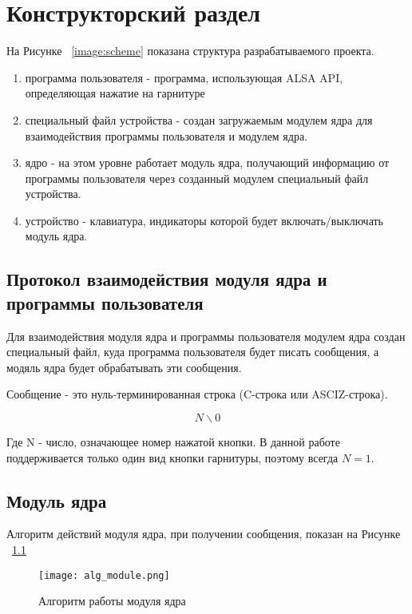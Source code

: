 \chapter{Конструкторский раздел}

На Рисунке ~\ref{image:scheme} показана структура разрабатываемого проекта.

\begin{enumerate}
\item программа пользователя - программа, использующая ALSA API, определяющая нажатие на гарнитуре
\item специальный файл устройства - создан загружаемым модулем ядра для взаимодействия программы пользователя и модулем ядра.
\item ядро - на этом уровне работает модуль ядра, получающий информацию от программы пользователя через созданный модулем специальный файл устройства.
\item устройство - клавиатура, индикаторы которой будет включать/выключать модуль ядра.
\end{enumerate}

\section{Протокол взаимодействия модуля ядра и программы пользователя}

Для взаимодействия модуля ядра и программы пользователя модулем ядра создан специальный файл, куда программа пользователя будет писать сообщения, а модяль ядра будет обрабатывать эти сообщения.

Сообщение - это нуль-терминированная строка (C-строка или ASCIZ-строка). 

$$N \backslash 0$$ 

Где N - число, означающее номер нажатой кнопки. В данной работе поддерживается только один вид кнопки гарнитуры, поэтому всегда $N = 1$.

\section{Модуль ядра}

Алгоритм действий модуля ядра, при получении сообщения, показан на Рисунке ~\ref{image:alg_module}

\begin{figure}[h]
  \centering
  \texttt{[image: alg\_module.png]}
  \caption{Алгоритм работы модуля ядра}
  \label{image:alg_module}
\end{figure}

